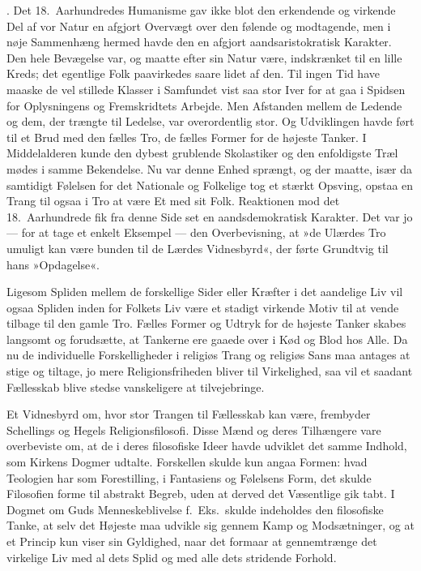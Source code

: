 \documentclass[12pt,a4paper]{article}
\newcommand{\apage}[1]{\marginnote{\footnotesize\textit{[#1]}}}
\begin{document}
\medskip
{}. Det 18.\ Aarhundredes Humanisme gav ikke blot den erkendende og
virkende Del af vor Natur en afgjort Overvægt over den følende og modtagende, men i
nøje Sammenhæng hermed havde den en afgjort aandsaristokratisk Karakter. Den hele
Bevægelse var, og maatte efter sin Natur være, indskrænket til en lille Kreds; det
egentlige Folk paavirkedes saare lidet af den. Til ingen Tid have maaske de vel
stillede Klasser i Samfundet vist saa stor \apage{206} Iver for at gaa i Spidsen for Oplysningens
og Fremskridtets Arbejde. Men Afstanden mellem de Ledende og dem, der trængte til
Ledelse, var overordentlig stor. Og Udviklingen havde ført til et Brud med den fælles
Tro, de fælles Former for de højeste Tanker. I Middelalderen kunde den dybest
grublende Skolastiker og den enfoldigste Træl mødes i samme Bekendelse. Nu var denne
Enhed sprængt, og der maatte, især da samtidigt Følelsen for det Nationale og
Folkelige tog et stærkt Opsving, opstaa en Trang til ogsaa i Tro at være Et med sit
Folk. Reaktionen mod det 18.\ Aarhundrede fik fra denne Side set en aandsdemokratisk
Karakter. Det var jo --- for at tage et enkelt Eksempel --- den Overbevisning, at
»de Ulærdes Tro umuligt kan være bunden til de Lærdes Vidnesbyrd«, der førte Grundtvig
til hans »Opdagelse«.

Ligesom Spliden mellem de forskellige Sider eller Kræfter i det aandelige Liv vil
ogsaa Spliden inden for Folkets Liv være et stadigt virkende Motiv til at vende
tilbage til den gamle Tro. Fælles Former og Udtryk for de højeste Tanker skabes
langsomt og forudsætte, at Tankerne ere gaaede over i Kød og Blod hos Alle. Da nu
de individuelle Forskelligheder i religiøs Trang og religiøs Sans maa antages at
stige og tiltage, jo mere Religionsfriheden bliver til Virkelighed, saa vil et saadant
Fællesskab blive stedse vanskeligere at tilvejebringe.

Et Vidnesbyrd om, hvor stor Trangen til Fællesskab kan være, frembyder Schellings og
Hegels Religionsfilosofi. Disse Mænd og deres Tilhængere vare overbeviste om, at de i
deres filosofiske Ideer havde udviklet det samme Indhold, som Kirkens Dogmer udtalte.
Forskellen skulde kun angaa Formen: hvad Teologien har som Forestilling, i Fantasiens
og Følelsens Form, det skulde Filosofien forme til abstrakt Begreb, uden at derved det
Væsentlige gik tabt. I Dogmet om Guds Menneskeblivelse f.\ Eks.\ skulde indeholdes den
filosofiske Tanke, at selv det Højeste maa udvikle sig gennem Kamp og Modsætninger, og
at et Princip kun viser sin Gyldighed, naar det formaar at gennemtrænge det virkelige
Liv med al dets Splid og med alle dets stridende Forhold. \apage{207}
\end{document}
